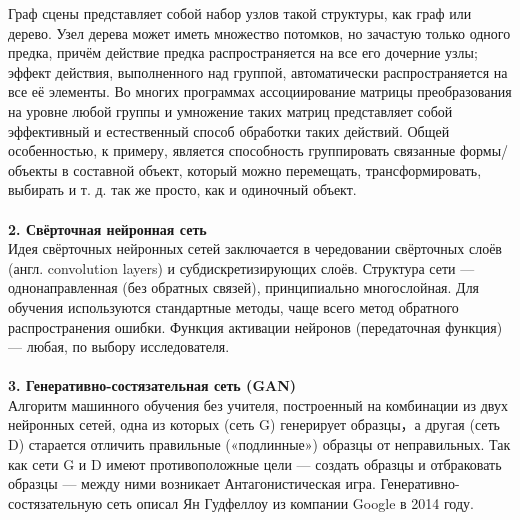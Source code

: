 \documentclass{article}
\begin{document}
    Граф сцены представляет собой набор узлов такой структуры, как граф или дерево. Узел дерева может иметь множество потомков, но зачастую только одного предка, причём действие предка распространяется на все его дочерние узлы; эффект действия, выполненного над группой, автоматически распространяется на все её элементы. Во многих программах ассоциирование матрицы преобразования на уровне любой группы и умножение таких матриц представляет собой эффективный и естественный способ обработки таких действий. Общей особенностью, к примеру, является способность группировать связанные формы/объекты в составной объект, который можно перемещать, трансформировать, выбирать и т. д. так же просто, как и одиночный объект. \\ \\
    \textbf{2. Свёрточная нейронная сеть}\\
    Идея свёрточных нейронных сетей заключается в чередовании свёрточных слоёв (англ. convolution layers) и субдискретизирующих слоёв. Структура сети — однонаправленная (без обратных связей), принципиально многослойная. Для обучения используются стандартные методы, чаще всего метод обратного распространения ошибки. Функция активации нейронов (передаточная функция) — любая, по выбору исследователя.  \\ \\
    \textbf{3. Генеративно-состязательная сеть (GAN)}\\
    Алгоритм машинного обучения без учителя, построенный на комбинации из двух нейронных сетей, одна из которых (сеть G) генерирует образцы，а другая (сеть D) старается отличить правильные («подлинные») образцы от неправильных. Так как сети G и D имеют противоположные цели — создать образцы и отбраковать образцы — между ними возникает Антагонистическая игра. Генеративно-состязательную сеть описал Ян Гудфеллоу из компании Google в 2014 году.
\end{document}

